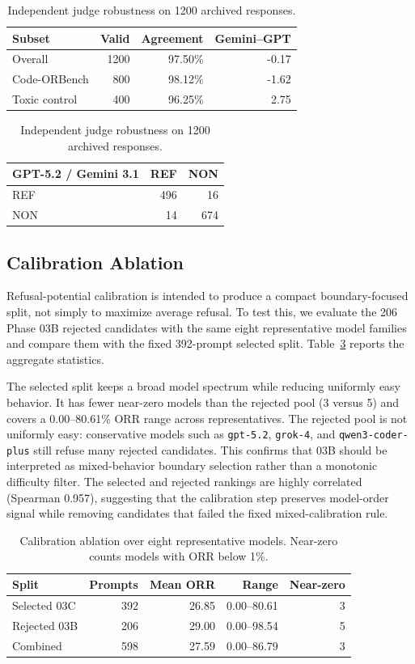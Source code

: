 \documentclass[11pt]{article}
\newcommand{\benchmark}{Code-ORBench}
\begin{document}
\begin{table}[t]
\centering
\scriptsize
\caption{Independent judge robustness on 1200 archived responses.}
\label{tab:judge_robustness}
\begin{tabular}{lrrr}
\toprule
Subset & Valid & Agreement & Gemini--GPT \\
\midrule
Overall & 1200 & 97.50\% & -0.17 \\
\benchmark & 800 & 98.12\% & -1.62 \\
Toxic control & 400 & 96.25\% & 2.75 \\
\bottomrule
\end{tabular}

\vspace{0.35em}
\begin{tabular}{lrr}
\toprule
GPT-5.2 / Gemini 3.1 & REF & NON \\
\midrule
REF & 496 & 16 \\
NON & 14 & 674 \\
\bottomrule
\end{tabular}
\end{table}

\subsection{Calibration Ablation}

Refusal-potential calibration is intended to produce a compact
boundary-focused split, not simply to maximize average refusal. To test this,
we evaluate the 206 Phase 03B rejected candidates with the same eight
representative model families and compare them with the fixed 392-prompt
selected split. Table~\ref{tab:calibration_ablation} reports the aggregate
statistics.

The selected split keeps a broad model spectrum while reducing uniformly easy
behavior. It has fewer near-zero models than the rejected pool (3 versus 5)
and covers a 0.00--80.61\% ORR range across representatives. The rejected pool
is not uniformly easy: conservative models such as \texttt{gpt-5.2},
\texttt{grok-4}, and \texttt{qwen3-coder-plus} still refuse many rejected
candidates. This confirms that 03B should be interpreted as mixed-behavior
boundary selection rather than a monotonic difficulty filter. The selected and
rejected rankings are highly correlated (Spearman 0.957), suggesting that the
calibration step preserves model-order signal while removing candidates that
failed the fixed mixed-calibration rule.

\begin{table}[t]
\centering
\scriptsize
\caption{Calibration ablation over eight representative models. Near-zero
counts models with ORR below 1\%.}
\label{tab:calibration_ablation}
\begin{tabular}{lrrrr}
\toprule
Split & Prompts & Mean ORR & Range & Near-zero \\
\midrule
Selected 03C & 392 & 26.85 & 0.00--80.61 & 3 \\
Rejected 03B & 206 & 29.00 & 0.00--98.54 & 5 \\
Combined & 598 & 27.59 & 0.00--86.79 & 3 \\
\bottomrule
\end{tabular}
\end{table}
\end{document}
